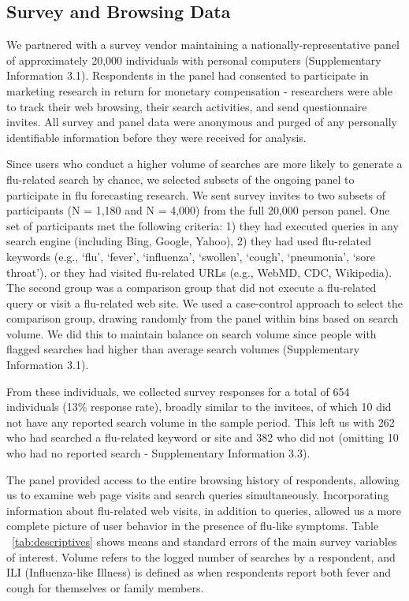 \documentclass[fleqn,10pt]{wlscirep}
\begin{document}
\subsection*{Survey and Browsing Data}

We partnered with a survey vendor maintaining a nationally-representative panel of approximately 20,000 individuals with personal computers (Supplementary Information 3.1). Respondents in the panel had consented to participate in marketing research in return for monetary compensation - researchers were able to track their web browsing, their search activities, and send questionnaire invites. All survey and panel data were anonymous and purged of any personally identifiable information before they were received for analysis. 

Since users who conduct a higher volume of searches are more likely to generate a flu-related search by chance, we selected subsets of the ongoing panel to participate in flu forecasting research. We sent survey invites to two subsets of participants (N = 1,180 and N = 4,000) from the full 20,000 person panel. One set of participants met the following criteria: 1) they had executed queries in any search engine (including Bing, Google, Yahoo), 2) they had used flu-related keywords (e.g., `flu', `fever', `influenza', `swollen', `cough', `pneumonia', `sore throat'), or they had visited flu-related URLs (e.g., WebMD, CDC, Wikipedia). The second group was a comparison group that did not execute a flu-related query or visit a flu-related web site. We used a case-control approach to select the comparison group, drawing randomly from the panel within bins based on search volume. We did this to maintain balance on search volume since people with flagged searches had higher than average search volumes (Supplementary Information 3.1).

From these individuals, we collected survey responses for a total of 654 individuals (13\% response rate), broadly similar to the invitees, of which 10 did not have any reported search volume in the sample period. This left us with 262 who had searched a flu-related keyword or site and 382 who did not (omitting 10 who had no reported search - Supplementary Information 3.3). 

The panel provided access to the entire browsing history of respondents, allowing us to examine web page visits and search queries simultaneously. Incorporating information about flu-related web visits, in addition to queries, allowed us a more complete picture of user behavior in the presence of flu-like symptoms. Table ~\ref{tab:descriptives} shows means and standard errors of the main survey variables of interest. Volume refers to the logged number of searches by a respondent, and ILI (Influenza-like Illness) is defined as when respondents report both fever and cough for themselves or family members.
\end{document}
